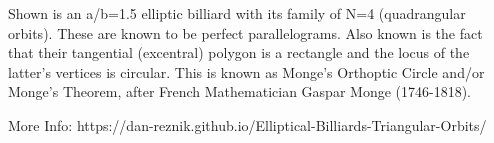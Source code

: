 Shown is an a/b=1.5 elliptic billiard with its family of N=4 (quadrangular orbits). These are known to be perfect parallelograms. Also known is the fact that their tangential (excentral) polygon is a rectangle and the locus of the latter's vertices is circular. This is known as Monge's Orthoptic Circle and/or Monge's Theorem, after French Mathematician Gaspar Monge (1746-1818).

More Info: https://dan-reznik.github.io/Elliptical-Billiards-Triangular-Orbits/